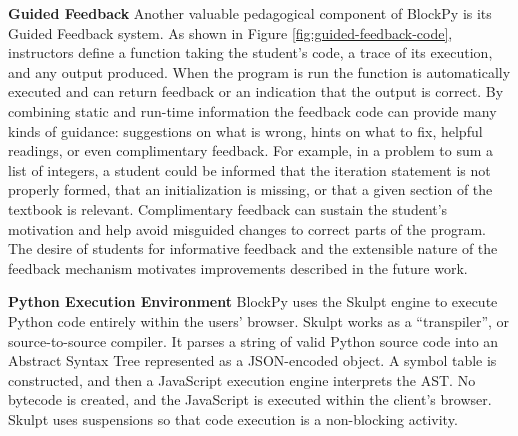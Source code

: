\documentclass[10pt,journal,compsoc]{IEEEtran}
\begin{document}
\medskip
\textbf{Guided Feedback}
Another valuable pedagogical component of BlockPy is its Guided Feedback system.
As shown in Figure \ref{fig:guided-feedback-code}, instructors define a function taking the student’s code, a trace of its execution, and any output produced.
When the program is run the function is automatically executed and can return feedback or an indication that the output is correct.
By combining static and run-time information the feedback code can provide many kinds of guidance: suggestions on what is wrong, hints on what to
fix, helpful readings, or even complimentary feedback.
For example, in a problem to sum a list of integers, a student could be informed that the iteration statement is not properly formed, that an initialization is missing, or that a given section of the textbook is relevant.
Complimentary feedback can sustain the student's motivation and help avoid misguided changes to correct parts of the program.
The desire of students for informative feedback and the extensible nature of the feedback mechanism motivates improvements described in the future work.

\medskip
\textbf{Python Execution Environment}
BlockPy uses the Skulpt engine to execute Python code entirely within the users' browser.
Skulpt works as a ``transpiler'', or source-to-source compiler.
It parses a string of valid Python source code into an Abstract Syntax Tree represented as a JSON-encoded object.
A symbol table is constructed, and then a JavaScript execution engine interprets the AST.
No bytecode is created, and the JavaScript is executed within the client's browser.
Skulpt uses suspensions so that code execution is a non-blocking activity.
\end{document}
